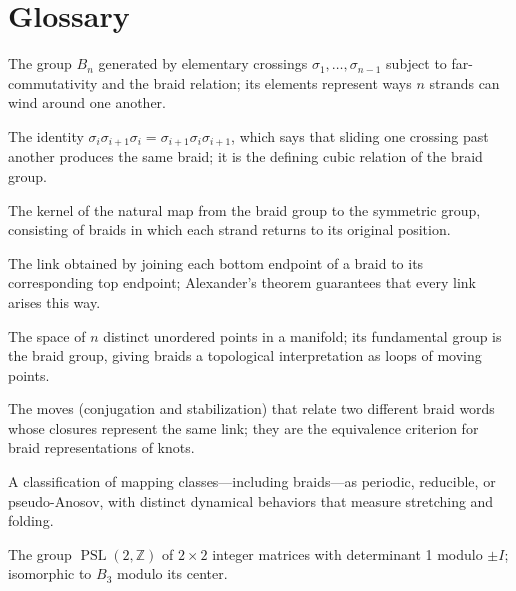 \section*{Glossary}
\begin{description}[leftmargin=*,style=nextline,itemsep=0.3em]

\item[\textbf{Braid group.}] The group $B_n$ generated by elementary crossings $\sigma_1,\ldots,\sigma_{n-1}$ subject to far-commutativity and the braid relation; its elements represent ways $n$ strands can wind around one another.

\item[\textbf{Braid relation.}] The identity $\sigma_i\sigma_{i+1}\sigma_i=\sigma_{i+1}\sigma_i\sigma_{i+1}$, which says that sliding one crossing past another produces the same braid; it is the defining cubic relation of the braid group.

\item[\textbf{Pure braid group.}] The kernel of the natural map from the braid group to the symmetric group, consisting of braids in which each strand returns to its original position.

\item[\textbf{Closure of a braid.}] The link obtained by joining each bottom endpoint of a braid to its corresponding top endpoint; Alexander's theorem guarantees that every link arises this way.

\item[\textbf{Configuration space.}] The space of $n$ distinct unordered points in a manifold; its fundamental group is the braid group, giving braids a topological interpretation as loops of moving points.

\item[\textbf{Markov moves.}] The moves (conjugation and stabilization) that relate two different braid words whose closures represent the same link; they are the equivalence criterion for braid representations of knots.

\item[\textbf{Nielsen--Thurston classification.}] A classification of mapping classes---including braids---as periodic, reducible, or pseudo-Anosov, with distinct dynamical behaviors that measure stretching and folding.

\item[\textbf{Modular group.}] The group $\operatorname{PSL}(2,\mathbb Z)$ of $2\times2$ integer matrices with determinant 1 modulo $\pm I$; isomorphic to $B_3$ modulo its center.


\end{description}
